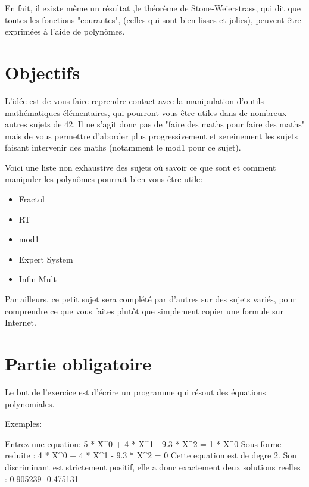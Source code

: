 \documentclass{42}
\begin{document}
\info
{
En fait, il existe même un résultat ,le théorème de Stone-Weierstrass, qui dit que toutes les fonctions "courantes", (celles qui sont bien lisses et jolies), peuvent être exprimées à l'aide de polynômes.
}

\chapter{Objectifs}

L’idée est de vous faire reprendre contact avec la manipulation d'outils mathématiques élémentaires, qui pourront vous être utiles dans de nombreux autres sujets de 42. Il ne s'agit donc pas de "faire des maths pour faire des maths" mais de vous permettre d'aborder plus progressivement et sereinement les sujets faisant intervenir des maths (notamment le mod1 pour ce sujet).

Voici une liste non exhaustive des sujets où savoir ce que sont et comment manipuler les polynômes pourrait bien vous être utile:
	\begin{itemize}
	\item Fractol
	\item RT
	\item mod1
	\item Expert System
	\item Infin Mult
\end{itemize}

Par ailleurs, ce petit sujet sera complété par d'autres sur des sujets variés, pour comprendre ce que vous faites plutôt que simplement copier une formule sur Internet.

\chapter{Partie obligatoire}


\makeheaderbasic

Le but de l'exercice est d'écrire un programme qui résout des équations polynomiales.

Exemples:

\begin{42console}
Entrez une equation: 5 * X^0 + 4 * X^1 - 9.3 * X^2 = 1 * X^0
Sous forme reduite : 4 * X^0 + 4 * X^1 - 9.3 * X^2 = 0
Cette equation est de degre 2.
Son discriminant est strictement positif, elle a donc exactement deux solutions reelles :
0.905239
-0.475131
\end{42console}
\end{document}
